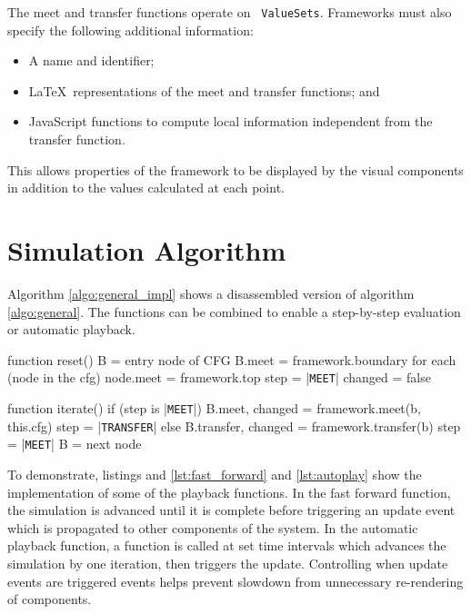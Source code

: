 \documentclass[bsc,twoside,singlespacing,parskip,logo,notimes,normalheadings]{infthesis}
\begin{document}
    The meet and transfer functions operate on {\tt
      ValueSets}. Frameworks must also specify the following additional
    information:

    \begin{itemize}
    \item A name and identifier;
    \item \LaTeX\ representations of the \gls{meet} and \gls{transfer} functions; and
    \item JavaScript functions to compute local information
      independent from the \gls{transfer} function.
    \end{itemize}

    This allows properties of the framework to be displayed by the
    visual components in addition to the values calculated at each
    point.
    
    \section{Simulation Algorithm}
    Algorithm \ref{algo:general_impl} shows a disassembled version of
    algorithm \ref{algo:general}. The functions can be combined to
    enable a step-by-step evaluation or automatic playback.

    \begin{algorithm}[caption={Implementation of General Framework Algorithm}, label={algo:general_impl},escapeinside={||},mathescape=true]
function reset()
    B = entry node of CFG
    B.meet = framework.boundary
    for each (node in the cfg)
        node.meet = framework.top
    step    = |{\tt MEET}|
    changed = false

function iterate()
    if (step is |{\tt MEET}|)
        B.meet, changed = framework.meet(b, this.cfg)
        step = |{\tt TRANSFER}|
    else
        B.transfer, changed = framework.transfer(b)
        step = |{\tt MEET}|
        B    = next node
    \end{algorithm}

    To demonstrate, listings and \ref{lst:fast_forward} and
    \ref{lst:autoplay} show the implementation of some of the playback
    functions. In the fast forward function, the simulation is
    advanced until it is complete before triggering an update event
    which is propagated to other components of the system. In the
    automatic playback function, a function is called at set time
    intervals which advances the simulation by one iteration, then
    triggers the update. Controlling when update events are triggered
    events helps prevent slowdown from unnecessary re-rendering of
    components.
\end{document}

